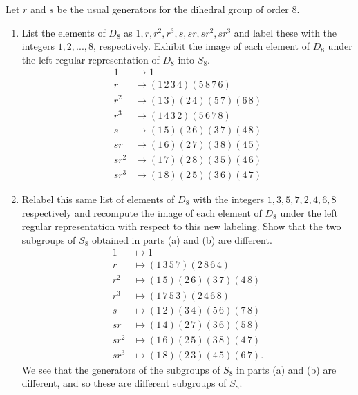 \documentclass{article}
\begin{document}
Let $r$ and $s$ be the usual generators for the dihedral group of order 8.
\begin{enumerate}[label=(\alph*), itemsep=0em]
    \item List the elements of $D_8$ as $1, r, r^2, r^3, s, sr, sr^2, sr^3$ and label these with the integers $1, 2, ..., 8$, respectively. Exhibit the image of each element of $D_8$ under the left regular representation of $D_8$ into $S_8$.
        \begin{align*}
            1 &\mapsto 1 \\
            r &\mapsto (1\,2\,3\,4)(5\,8\,7\,6) \\
            r^2 &\mapsto (1\,3)(2\,4)(5\,7)(6\,8) \\
            r^3 &\mapsto (1\,4\,3\,2)(5\,6\,7\,8) \\
            s &\mapsto (1\,5)(2\,6)(3\,7)(4\,8) \\
            sr &\mapsto (1\,6)(2\,7)(3\,8)(4\,5) \\
            sr^2 &\mapsto (1\,7)(2\,8)(3\,5)(4\,6) \\
            sr^3 &\mapsto (1\,8)(2\,5)(3\,6)(4\,7)
        \end{align*}
    \item Relabel this same list of elements of $D_8$ with the integers $1, 3, 5, 7, 2, 4, 6, 8$ respectively and recompute the image of each element of $D_8$ under the left regular representation with respect to this new labeling. Show that the two subgroups of $S_8$ obtained in parts (a) and (b) are different.
        \begin{align*}
            1 &\mapsto 1 \\
            r &\mapsto (1\,3\,5\,7)(2\,8\,6\,4) \\
            r^2 &\mapsto (1\,5)(2\,6)(3\,7)(4\,8) \\
            r^3 &\mapsto (1\,7\,5\,3)(2\,4\,6\,8) \\
            s &\mapsto (1\,2)(3\,4)(5\,6)(7\,8) \\
            sr &\mapsto (1\,4)(2\,7)(3\,6)(5\,8) \\
            sr^2 &\mapsto (1\,6)(2\,5)(3\,8)(4\,7) \\
            sr^3 &\mapsto (1\,8)(2\,3)(4\,5)(6\,7).
        \end{align*}
        We see that the generators of the subgroups of $S_8$ in parts (a) and (b) are different, and so these are different subgroups of $S_8$.
\end{enumerate}
\end{document}
